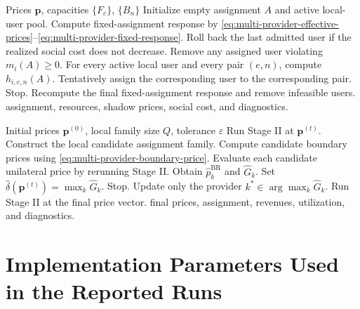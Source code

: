 \documentclass[11pt]{article}
\begin{document}
\begin{algorithm}[h]
\caption{Multi-Provider Stage-II Heuristic}
\begin{algorithmic}[1]
\REQUIRE Prices \(\boldsymbol p\), capacities \(\{F_e\}\), \(\{B_n\}\)
\STATE Initialize empty assignment \(A\) and active local-user pool.
\REPEAT
    \STATE Compute fixed-assignment response by
    \eqref{eq:multi-provider-effective-prices}--\eqref{eq:multi-provider-fixed-response}.
    \STATE Roll back the last admitted user if the realized social cost does not decrease.
    \STATE Remove any assigned user violating \(m_i(A)\ge 0\).
    \STATE For every active local user and every pair \((e,n)\), compute \(h_{i,e,n}(A)\).
        \STATE Tentatively assign the corresponding user to the corresponding pair.
    \ELSE
        \STATE Stop.
    \ENDIF
{}
\STATE Recompute the final fixed-assignment response and remove infeasible users.
\RETURN assignment, resources, shadow prices, social cost, and diagnostics.
\end{algorithmic}
\end{algorithm}

\begin{algorithm}[h]
\caption{Six-Provider Boundary-Price Pricing Dynamics}
\begin{algorithmic}[1]
\REQUIRE Initial prices \(\boldsymbol p^{(0)}\), local family size \(Q\), tolerance \(\varepsilon\)
    \STATE Run Stage II at \(\boldsymbol p^{(t)}\).
        \STATE Construct the local candidate assignment family.
        \STATE Compute candidate boundary prices using \eqref{eq:multi-provider-boundary-price}.
        \STATE Evaluate each candidate unilateral price by rerunning Stage II.
        \STATE Obtain \(\widehat p_k^{\mathrm{BR}}\) and \(\widehat G_k\).
    \ENDFOR
    \STATE Set \(\widehat\delta(\boldsymbol p^{(t)})=\max_k\widehat G_k\).
        \STATE Stop.
    \ENDIF
    \STATE Update only the provider \(k^*\in\arg\max_k\widehat G_k\).
\ENDFOR
\STATE Run Stage II at the final price vector.
\RETURN final prices, assignment, revenues, utilization, and diagnostics.
\end{algorithmic}
\end{algorithm}

\section{Implementation Parameters Used in the Reported Runs}
\end{document}
